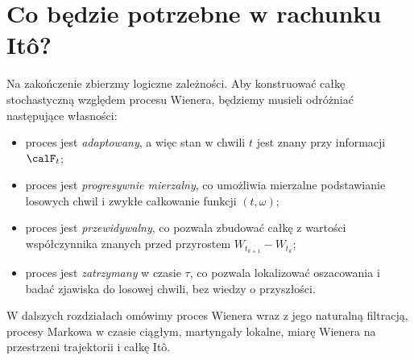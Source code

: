 \section{Co będzie potrzebne w rachunku Itô?}
Na zakończenie zbierzmy logiczne zależności.
Aby konstruować całkę stochastyczną względem procesu Wienera,
będziemy musieli odróżniać następujące własności:
\begin{itemize}
\item proces jest \emph{adaptowany}, a więc stan w chwili $t$
jest znany przy informacji $\calF_t$;
\item proces jest \emph{progresywnie mierzalny}, co umożliwia
mierzalne podstawianie losowych chwil i zwykłe całkowanie
funkcji $(t,\omega)$;
\item proces jest \emph{przewidywalny}, co pozwala zbudować
całkę z wartości współczynnika znanych przed
przyrostem $W_{t_{k+1}}-W_{t_k}$;
\item proces jest \emph{zatrzymany} w czasie $\tau$,
co pozwala lokalizować oszacowania i badać zjawiska
do losowej chwili, bez wiedzy o przyszłości.
\end{itemize}
W dalszych rozdziałach omówimy proces Wienera
wraz z jego naturalną filtracją, procesy Markowa
w czasie ciągłym, martyngały lokalne, miarę Wienera
na przestrzeni trajektorii i całkę Itô.


